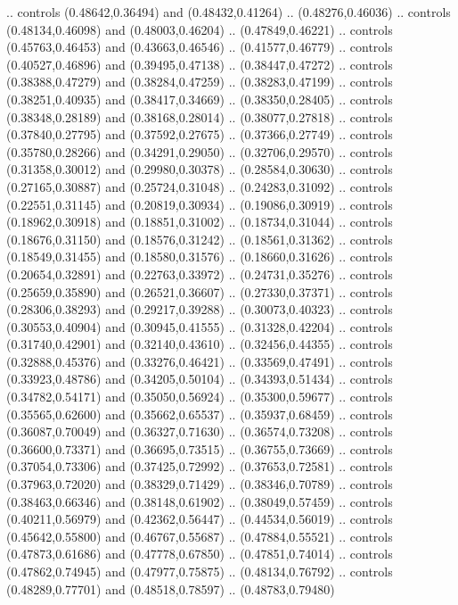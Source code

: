     .. controls (0.48642,0.36494) and (0.48432,0.41264) .. (0.48276,0.46036)
    .. controls (0.48134,0.46098) and (0.48003,0.46204) .. (0.47849,0.46221)
    .. controls (0.45763,0.46453) and (0.43663,0.46546) .. (0.41577,0.46779)
    .. controls (0.40527,0.46896) and (0.39495,0.47138) .. (0.38447,0.47272)
    .. controls (0.38388,0.47279) and (0.38284,0.47259) .. (0.38283,0.47199)
    .. controls (0.38251,0.40935) and (0.38417,0.34669) .. (0.38350,0.28405)
    .. controls (0.38348,0.28189) and (0.38168,0.28014) .. (0.38077,0.27818)
    .. controls (0.37840,0.27795) and (0.37592,0.27675) .. (0.37366,0.27749)
    .. controls (0.35780,0.28266) and (0.34291,0.29050) .. (0.32706,0.29570)
    .. controls (0.31358,0.30012) and (0.29980,0.30378) .. (0.28584,0.30630)
    .. controls (0.27165,0.30887) and (0.25724,0.31048) .. (0.24283,0.31092)
    .. controls (0.22551,0.31145) and (0.20819,0.30934) .. (0.19086,0.30919)
    .. controls (0.18962,0.30918) and (0.18851,0.31002) .. (0.18734,0.31044)
    .. controls (0.18676,0.31150) and (0.18576,0.31242) .. (0.18561,0.31362)
    .. controls (0.18549,0.31455) and (0.18580,0.31576) .. (0.18660,0.31626)
    .. controls (0.20654,0.32891) and (0.22763,0.33972) .. (0.24731,0.35276)
    .. controls (0.25659,0.35890) and (0.26521,0.36607) .. (0.27330,0.37371)
    .. controls (0.28306,0.38293) and (0.29217,0.39288) .. (0.30073,0.40323)
    .. controls (0.30553,0.40904) and (0.30945,0.41555) .. (0.31328,0.42204)
    .. controls (0.31740,0.42901) and (0.32140,0.43610) .. (0.32456,0.44355)
    .. controls (0.32888,0.45376) and (0.33276,0.46421) .. (0.33569,0.47491)
    .. controls (0.33923,0.48786) and (0.34205,0.50104) .. (0.34393,0.51434)
    .. controls (0.34782,0.54171) and (0.35050,0.56924) .. (0.35300,0.59677)
    .. controls (0.35565,0.62600) and (0.35662,0.65537) .. (0.35937,0.68459)
    .. controls (0.36087,0.70049) and (0.36327,0.71630) .. (0.36574,0.73208)
    .. controls (0.36600,0.73371) and (0.36695,0.73515) .. (0.36755,0.73669)
    .. controls (0.37054,0.73306) and (0.37425,0.72992) .. (0.37653,0.72581)
    .. controls (0.37963,0.72020) and (0.38329,0.71429) .. (0.38346,0.70789)
    .. controls (0.38463,0.66346) and (0.38148,0.61902) .. (0.38049,0.57459)
    .. controls (0.40211,0.56979) and (0.42362,0.56447) .. (0.44534,0.56019)
    .. controls (0.45642,0.55800) and (0.46767,0.55687) .. (0.47884,0.55521)
    .. controls (0.47873,0.61686) and (0.47778,0.67850) .. (0.47851,0.74014)
    .. controls (0.47862,0.74945) and (0.47977,0.75875) .. (0.48134,0.76792)
    .. controls (0.48289,0.77701) and (0.48518,0.78597) .. (0.48783,0.79480)
